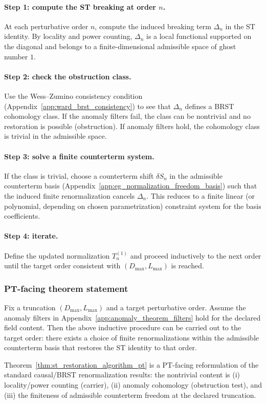 \paragraph{Step 1: compute the ST breaking at order $n$.}
At each perturbative order $n$, compute the induced breaking term $\Delta_n$ in the ST identity.
By locality and power counting, $\Delta_n$ is a local functional supported on the diagonal and belongs to a finite-dimensional admissible space of ghost number $1$.

\paragraph{Step 2: check the obstruction class.}
Use the Wess--Zumino consistency condition (Appendix~\ref{app:ward_brst_consistency}) to see that $\Delta_n$ defines a BRST cohomology class.
If the anomaly filters fail, the class can be nontrivial and no restoration is possible (obstruction).
If anomaly filters hold, the cohomology class is trivial in the admissible space.

\paragraph{Step 3: solve a finite counterterm system.}
If the class is trivial, choose a counterterm shift $\delta S_n$ in the admissible counterterm basis (Appendix~\ref{app:eg_normalization_freedom_basis}) such that the induced finite renormalization cancels $\Delta_n$.
This reduces to a finite linear (or polynomial, depending on chosen parametrization) constraint system for the basis coefficients.

\paragraph{Step 4: iterate.}
Define the updated normalization $T_n^{(1)}$ and proceed inductively to the next order until the target order consistent with $(D_{\max},L_{\max})$ is reached.

\subsubsection{PT-facing theorem statement}
\begin{theorem}
\label{thm:st_restoration_algorithm_pt}
\MathTag Fix a truncation $(D_{\max},L_{\max})$ and a target perturbative order.
Assume the anomaly filters in Appendix~\ref{app:anomaly_theorem_filters} hold for the declared field content.
Then the above inductive procedure can be carried out to the target order: there exists a choice of finite renormalizations within the admissible counterterm basis that restores the ST identity to that order.
\end{theorem}

\AuditTag Theorem~\ref{thm:st_restoration_algorithm_pt} is a PT-facing reformulation of the standard causal/BRST renormalization results:
the nontrivial content is (i) locality/power counting (carrier), (ii) anomaly cohomology (obstruction test), and (iii) the finiteness of admissible counterterm freedom at the declared truncation.

